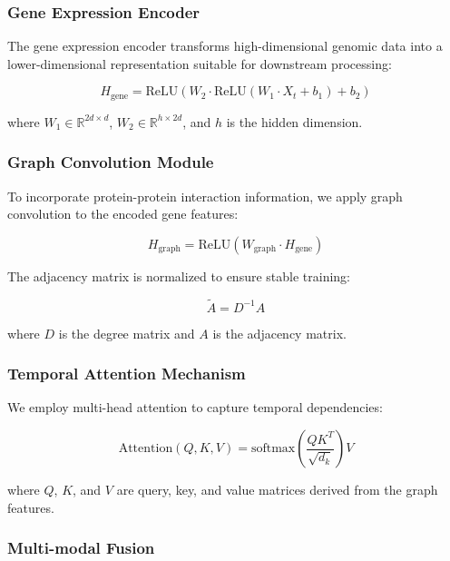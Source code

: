 \documentclass[conference]{IEEEtran}
\begin{document}
\subsubsection{Gene Expression Encoder}

The gene expression encoder transforms high-dimensional genomic data into a lower-dimensional representation suitable for downstream processing:

\begin{equation}
H_{\text{gene}} = \text{ReLU}(W_2 \cdot \text{ReLU}(W_1 \cdot X_t + b_1) + b_2)
\end{equation}

where $W_1 \in \mathbb{R}^{2d \times d}$, $W_2 \in \mathbb{R}^{h \times 2d}$, and $h$ is the hidden dimension.

\subsubsection{Graph Convolution Module}

To incorporate protein-protein interaction information, we apply graph convolution to the encoded gene features:

\begin{equation}
H_{\text{graph}} = \text{ReLU}(W_{\text{graph}} \cdot H_{\text{gene}})
\end{equation}

The adjacency matrix is normalized to ensure stable training:

\begin{equation}
\tilde{A} = D^{-1}A
\end{equation}

where $D$ is the degree matrix and $A$ is the adjacency matrix.

\subsubsection{Temporal Attention Mechanism}

We employ multi-head attention to capture temporal dependencies:

\begin{equation}
\text{Attention}(Q, K, V) = \text{softmax}\left(\frac{QK^T}{\sqrt{d_k}}\right)V
\end{equation}

where $Q$, $K$, and $V$ are query, key, and value matrices derived from the graph features.

\subsubsection{Multi-modal Fusion}
\end{document}
